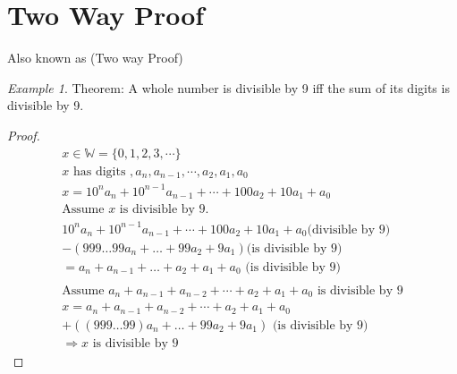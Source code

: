 \documentclass[12pt]{article}
\theoremstyle{remark}
\newtheorem*{example}{Example}
\begin{document}
	\section{Two Way Proof}
	Also known as (Two way Proof) 
	\begin{example}
		Theorem: A whole number is divisible by 9 iff the sum of its digits is divisible by 9.
		\begin{proof}
			\begin{gather}
				x \in \mathbb{W} = \{0, 1, 2, 3, \cdots\}\\ 
				x \text{ has digits }, a_n, a_{n - 1}, \cdots, a_2, a_1, a_0 \\
				x = 10^{n}a_n + 10^{n - 1}a_{n - 1} + \cdots + 100a_2 + 10a_1 + a_0\\
				\text{Assume } x \text{ is divisible by 9.}\\
				10^{n}a_n + 10^{n - 1}a_{n - 1} + \cdots + 100a_2 + 10a_1 + a_0 \text{(divisible by 9)}\\
				- (999\dots 99a_{n} + \dots + 99a_2 + 9a_1) \text{(is divisible by 9)} \\ 
				= a_n + a_{n - 1} + \dots  + a_2 + a_1 + a_0 \text{ (is divisible by 9)}\\ \\
				\text{Assume } a_n + a_{n - 1} + a_{n - 2} + \cdots + a_2 + a_1 + a_0  \text{ is divisible by 9} \\
				x = a_n + a_{n - 1} + a_{n - 2} + \cdots + a_2 + a_1 + a_0  \\
				+ ((999\dots 99)a_n + \dots + 99a_2 + 9a_1) \text{ (is divisible by 9)} \\
				\Rightarrow x \text{ is divisible by 9}
			\end{gather}
		\end{proof}
	\end{example}
	
\end{document}
